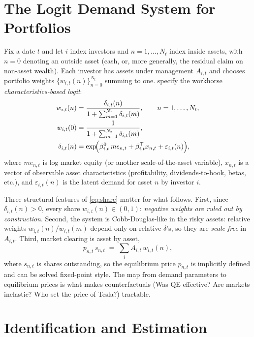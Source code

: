 \documentclass[11pt,a4paper]{article}
\newcommand{\eps}{\varepsilon}
\newcommand{\me}{\mathit{me}}
\begin{document}
\section{The Logit Demand System for Portfolios}

Fix a date $t$ and let $i$ index investors and $n=1,\dots,N_t$ index
inside assets, with $n=0$ denoting an outside asset (cash, or, more
generally, the residual claim on non-asset wealth). Each investor has
assets under management $A_{i,t}$ and chooses portfolio weights
$\{w_{i,t}(n)\}_{n=0}^{N_t}$ summing to one. \citet{koijen2019demand}
specify the workhorse \emph{characteristics-based logit}:
\begin{align}
w_{i,t}(n) &= \frac{\delta_{i,t}(n)}{1 + \sum_{m=1}^{N_t}\delta_{i,t}(m)}, \qquad n=1,\dots,N_t, \label{eq:share}\\
w_{i,t}(0) &= \frac{1}{1 + \sum_{m=1}^{N_t}\delta_{i,t}(m)},\\
\delta_{i,t}(n) &= \exp\!\Bigl(\beta^0_{i,t}\,\me_{n,t} + \beta_{i,t}^\top x_{n,t} + \eps_{i,t}(n)\Bigr), \label{eq:delta}
\end{align}
where $\me_{n,t}$ is log market equity (or another scale-of-the-asset
variable), $x_{n,t}$ is a vector of observable asset characteristics
(profitability, dividends-to-book, betas, etc.), and $\eps_{i,t}(n)$ is
the latent demand for asset $n$ by investor $i$.

Three structural features of \eqref{eq:share} matter for what
follows. First, since $\delta_{i,t}(n) > 0$, every share $w_{i,t}(n) \in
(0,1)$: \emph{negative weights are ruled out by construction}. Second,
the system is Cobb-Douglas-like in the risky assets: relative weights
$w_{i,t}(n)/w_{i,t}(m)$ depend only on relative $\delta$'s, so they are
\emph{scale-free} in $A_{i,t}$. Third, market clearing is asset by
asset,
\begin{equation}
p_{n,t}\,s_{n,t} \;=\; \sum_i A_{i,t}\,w_{i,t}(n),
\label{eq:clearing}
\end{equation}
where $s_{n,t}$ is shares outstanding, so the equilibrium price
$p_{n,t}$ is implicitly defined and can be solved fixed-point style.
The map from demand parameters to equilibrium prices is what makes
counterfactuals (Was QE effective? Are markets inelastic? Who set the
price of Tesla?) tractable.

\section{Identification and Estimation}
\end{document}
